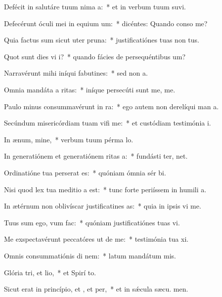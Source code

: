 \item Defécit in salutáre tuum nima a:~* et in verbum tuum suvi.
\item Defecérunt óculi mei in equium um:~* dicéntes: Quando conso me?
\item Quia factus sum sicut uter  pruna:~* justificatiónes tuas non  tus.
\item Quot sunt dies vi i?~* quando fácies de persequéntibus  um?
\item Narravérunt mihi iníqui fabutines:~* sed non   a.
\item Omnia mandáta a ritas:~* iníque persecúti sunt me,  me.
\item Paulo minus consummavérunt  in ra:~* ego autem non derelíqui man a.
\item Secúndum misericórdiam tuam vifi me:~* et custódiam testimónia  i.
\item In ænum, mine,~* verbum tuum pérma  lo.
\item In generatiónem et generatiónem ritas a:~* fundásti ter,  net.
\item Ordinatióne tua perserat es:~* quóniam ómnia sér bi.
\item Nisi quod lex tua meditio a est:~* tunc forte periíssem in humili a.
\item In ætérnum non oblivíscar justificatines as:~* quia in ipsis vi me.
\item Tuus sum ego, vum  fac:~* quóniam justificatiónes tuas vi.
\item Me exspectavérunt peccatóres ut de me:~* testimónia tua xi.
\item Omnis consummatiónis di nem:~* latum mandátum  mis.
\item Glória tri, et lio,~* et Spirí to.
\item Sicut erat in princípio, et , et per,~* et in sǽcula sæcu. men.
